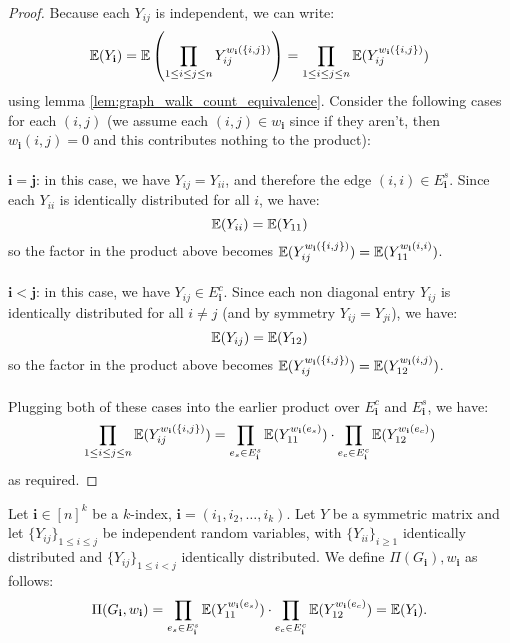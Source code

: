 \begin{proof}
\notready
Because each $Y_{ij}$ is independent, we can write:
$$
\mathbb{E}(Y_{\mathbf{i}}) = \mathbb{E}\left(\prod_{1 \leq i \leq j \leq n} Y_{ij}^{w_{\mathbf{i}}(\{i, j\})}\right) = \prod_{1 \leq i \leq j \leq n} \mathbb{E}(Y_{ij}^{w_{\mathbf{i}}(\{i, j\})})
$$
using lemma \ref{lem:graph_walk_count_equivalence}. Consider the following cases for each $(i, j)$ (we assume each $(i, j) \in w_{\mathbf{i}}$ since if they aren't, then $w_{\mathbf{i}}(i, j) = 0$ and this contributes nothing to the product):\\\\
$\mathbf{i = j}$: in this case, we have $Y_{ij} = Y_{ii}$, and therefore the edge $(i, i) \in E_{\mathbf{i}}^{s}$. Since each $Y_{ii}$ is identically distributed for all $i$, we have:
$$
\mathbb{E}(Y_{ii}) = \mathbb{E}(Y_{11})
$$
so the factor in the product above becomes $\mathbb{E}(Y_{ij}^{w_{\mathbf{i}}(\{i, j\})}) = \mathbb{E}(Y_{11}^{w_{\mathbf{i}}(i, i)})$.\\\\
$\mathbf{i < j}$: in this case, we have  $Y_{ij} \in E_{\mathbf{i}}^{c}$. Since each non diagonal entry $Y_{ij}$ is identically distributed for all $i \neq j$ (and by symmetry $Y_{ij} = Y_{ji}$), we have:
$$
\mathbb{E}(Y_{ij}) = \mathbb{E}(Y_{12})
$$
so the factor in the product above becomes $\mathbb{E}(Y_{ij}^{w_{\mathbf{i}}(\{i, j\})}) = \mathbb{E}(Y_{12}^{w_{\mathbf{i}}(i, j)})$.\\\\
Plugging both of these cases into the earlier product over $E_{\mathbf{i}}^{c}$ and $E_{\mathbf{i}}^{s}$, we have:
 $$
 \prod_{1 \leq i \leq j \leq n} \mathbb{E}(Y_{ij}^{w_{\mathbf{i}}(\{i, j\})}) = \prod_{e_s \in E_{\mathbf{i}}^s} \mathbb{E}(Y_{11}^{w_{\mathbf{i}}(e_s)}) \cdot \prod_{e_c \in E_{\mathbf{i}}^c} \mathbb{E}(Y_{12}^{w_{\mathbf{i}}(e_c)})
$$
as required.

\end{proof}

\begin{definition}
    \label{def:expectation_matrix_multi_index}
    \notready
    Let $\mathbf{i} \in [n]^{k}$ be a $k$-index, $\mathbf{i} = (i_1, i_2, \ldots, i_{k})$. Let $Y$ be a symmetric matrix and let $\{Y_{ij}\}_{1\le i\le j}$ be independent random variables, with $\{Y_{ii}\}_{i\ge 1}$ identically distributed and $\{Y_{ij}\}_{1\le i<j}$ identically distributed. We define $\Pi(G_{\mathbf{i}}), w_{\mathbf{i}}$ as follows:
    $$
    \Pi (G_{\mathbf{i}}, w_{\mathbf{i}}) = \prod_{e_s \in E_{\mathbf{i}}^s} \mathbb{E}(Y_{11}^{w_{\mathbf{i}}(e_s)}) \cdot \prod_{e_c \in E_{\mathbf{i}}^c} \mathbb{E}(Y_{12}^{w_{\mathbf{i}}(e_c)}) = \mathbb{E}(Y_{\mathbf{i}}).
    $$
\end{definition}

